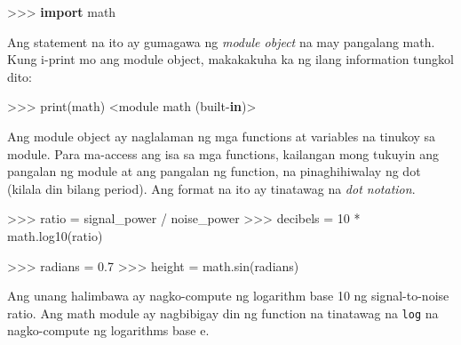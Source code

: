\documentclass[10pt,]{book}
\newenvironment{Shaded}{}{}
\newcommand{\BuiltInTok}[1]{\textcolor[rgb]{0.00,0.50,0.00}{#1}}
\newcommand{\DecValTok}[1]{\textcolor[rgb]{0.25,0.63,0.44}{#1}}
\newcommand{\FloatTok}[1]{\textcolor[rgb]{0.25,0.63,0.44}{#1}}
\newcommand{\ImportTok}[1]{\textcolor[rgb]{0.00,0.50,0.00}{\textbf{#1}}}
\newcommand{\KeywordTok}[1]{\textcolor[rgb]{0.00,0.44,0.13}{\textbf{#1}}}
\newcommand{\NormalTok}[1]{#1}
\newcommand{\OperatorTok}[1]{\textcolor[rgb]{0.40,0.40,0.40}{#1}}
\newcommand{\StringTok}[1]{\textcolor[rgb]{0.25,0.44,0.63}{#1}}
\begin{document}
\begin{Shaded}
\begin{Highlighting}[]
\OperatorTok{\textgreater{}\textgreater{}\textgreater{}} \ImportTok{import}\NormalTok{ math}
\end{Highlighting}
\end{Shaded}

Ang statement na ito ay gumagawa ng \emph{module object} na may
pangalang math. Kung i-print mo ang module object, makakakuha ka ng
ilang information tungkol dito:

\begin{Shaded}
\begin{Highlighting}[]
\OperatorTok{\textgreater{}\textgreater{}\textgreater{}} \BuiltInTok{print}\NormalTok{(math)}
\OperatorTok{\textless{}}\NormalTok{module }\StringTok{\textquotesingle{}math\textquotesingle{}}\NormalTok{ (built}\OperatorTok{{-}}\KeywordTok{in}\NormalTok{)}\OperatorTok{\textgreater{}}
\end{Highlighting}
\end{Shaded}

Ang module object ay naglalaman ng mga functions at variables na tinukoy
sa module. Para ma-access ang isa sa mga functions, kailangan mong
tukuyin ang pangalan ng module at ang pangalan ng function, na
pinaghihiwalay ng dot (kilala din bilang period). Ang format na ito ay
tinatawag na \emph{dot notation}.


\begin{Shaded}
\begin{Highlighting}[]
\OperatorTok{\textgreater{}\textgreater{}\textgreater{}}\NormalTok{ ratio }\OperatorTok{=}\NormalTok{ signal\_power }\OperatorTok{/}\NormalTok{ noise\_power}
\OperatorTok{\textgreater{}\textgreater{}\textgreater{}}\NormalTok{ decibels }\OperatorTok{=} \DecValTok{10} \OperatorTok{*}\NormalTok{ math.log10(ratio)}

\OperatorTok{\textgreater{}\textgreater{}\textgreater{}}\NormalTok{ radians }\OperatorTok{=} \FloatTok{0.7}
\OperatorTok{\textgreater{}\textgreater{}\textgreater{}}\NormalTok{ height }\OperatorTok{=}\NormalTok{ math.sin(radians)}
\end{Highlighting}
\end{Shaded}

Ang unang halimbawa ay nagko-compute ng logarithm base 10 ng
signal-to-noise ratio. Ang math module ay nagbibigay din ng function na
tinatawag na \texttt{log} na nagko-compute ng logarithms base e.
\end{document}
